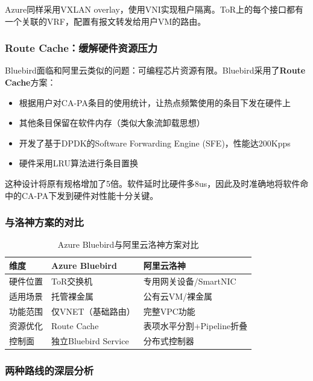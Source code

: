 Azure同样采用VXLAN overlay，使用VNI实现租户隔离。ToR上的每个接口都有一个关联的VRF，配置有报文转发给用户VM的路由。

\subsubsection{Route Cache：缓解硬件资源压力}

Bluebird面临和阿里云类似的问题：可编程芯片资源有限。Bluebird采用了\textbf{Route Cache}方案：

\begin{itemize}
    \item 根据用户对CA-PA条目的使用统计，让热点频繁使用的条目下发在硬件上
    \item 其他条目保留在软件内存（类似大象流卸载思想）
    \item 开发了基于DPDK的Software Forwarding Engine (SFE)，性能达200Kpps
    \item 硬件采用LRU算法进行条目置换
\end{itemize}

这种设计将原有规格增加了5倍。软件延时比硬件多8us，因此及时准确地将软件命中的CA-PA下发到硬件对性能十分关键。

\subsubsection{与洛神方案的对比}

\begin{table}[htbp]
\centering
\caption{Azure Bluebird与阿里云洛神方案对比}
\begin{tabular}{|l|l|l|}
\hline
\textbf{维度} & \textbf{Azure Bluebird} & \textbf{阿里云洛神} \\
\hline
硬件位置 & ToR交换机 & 专用网关设备/SmartNIC \\
\hline
适用场景 & 托管裸金属 & 公有云VM/裸金属 \\
\hline
功能范围 & 仅VNET（基础路由） & 完整VPC功能 \\
\hline
资源优化 & Route Cache & 表项水平分割+Pipeline折叠 \\
\hline
控制面 & 独立Bluebird Service & 分布式控制器 \\
\hline
\end{tabular}
\end{table}

\subsubsection{两种路线的深层分析}

